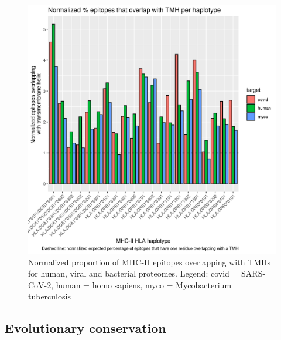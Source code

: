 \begin{figure}[!htbp]
  \includegraphics[width=\textwidth]{bbbq_1_smart_results/fig_f_tmh_mhc2_2_normalized.png}
  \caption{
    Normalized proportion of MHC-II epitopes overlapping with TMHs
    for human, viral and bacterial proteomes.
    Legend: covid = SARS-CoV-2,
    human = homo sapiens, myco = Mycobacterium tuberculosis
  }
  \label{fig:f_tmh_mhc2_normalized}
\end{figure}



\subsection{Evolutionary conservation}

